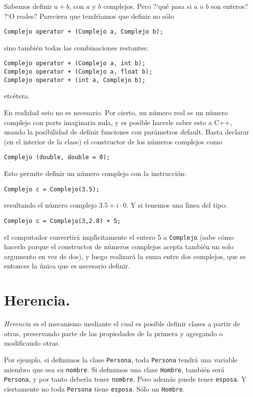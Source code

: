 Sabemos definir $a+b$, con $a$ y $b$ complejos. Pero ?`qu{\'e} pasa si
$a$ o $b$ son enteros? ?`O reales? Pareciera que tendr\'{\i}amos que
definir no s{\'o}lo
\begin{verbatim}
Complejo operator + (Complejo a, Complejo b);
\end{verbatim}
sino tambi{\'e}n todas las combinaciones restantes:
\begin{verbatim}
Complejo operator + (Complejo a, int b);
Complejo operator + (Complejo a, float b);
Complejo operator + (int a, Complejo b);
\end{verbatim}
etc{\'e}tera.

En realidad esto no es necesario. Por cierto, un n{\'u}mero real es un
n{\'u}mero complejo con parte imaginaria nula, y es posible hacerle saber
esto a C++, usando la posibilidad de definir funciones con
par{\'a}metros default. Basta declarar (en el interior de la clase) el
constructor de los n{\'u}meros complejos como
\begin{verbatim}
Complejo (double, double = 0);
\end{verbatim}
Esto permite definir un n{\'u}mero complejo con la instrucci{\'o}n:
\begin{verbatim}
Complejo c = Complejo(3.5);
\end{verbatim}
resultando el n{\'u}mero complejo $3.5 + i\cdot 0$. Y si tenemos una
l\'{\i}nea del tipo:
\begin{verbatim}
Complejo c = Complejo(3,2.8) + 5;
\end{verbatim}
el computador convertir{\'a} impl{\'\i}citamente el entero 5 a
\verb+Complejo+ (sabe c{\'o}mo hacerlo porque el constructor de n{\'u}meros
complejos acepta tambi{\'e}n un solo argumento en vez de dos), y luego
realizar{\'a} la suma entre dos complejos, que es entonces la {\'u}nica
que es necesario definir. 


\section{Herencia.}

{\em Herencia\/} es el mecanismo mediante el cual es posible definir
clases a partir de otras, preservando parte de las propiedades de la
primera y agregando o modificando otras.

Por ejemplo, si definimos la clase \verb+Persona+, toda
\verb+Persona+ tendr{\'a} una variable miembro que sea su
\verb+nombre+. Si definimos una clase \verb+Hombre+, tambi{\'e}n ser{\'a}
\verb+Persona+, y por tanto deber\'{\i}a tener \verb+nombre+. Pero adem{\'a}s
puede tener \verb+esposa+. Y ciertamente no toda \verb+Persona+ tiene
\verb+esposa+. S{\'o}lo un \verb+Hombre+. 

